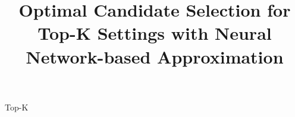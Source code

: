 
\title{Optimal Candidate Selection for Top-K Settings with Neural Network-based Approximation}
Top-K 

